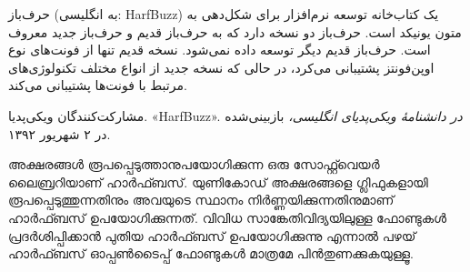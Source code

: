 \documentclass{article}
\begin{document}
حرف‌باز (به انگلیسی: HarfBuzz) یک کتاب‌خانه توسعه نرم‌افزار برای
شکل‌دهی به متون یونیکد است. حرف‌باز دو نسخه دارد که به حرف‌باز قدیم و
حرف‌باز جدید معروف است. حرف‌باز قدیم دیگر توسعه داده نمی‌شود. نسخه قدیم
تنها از فونت‌های نوع اوپن‌فونتز پشتیبانی می‌کرد، در حالی که نسخه جدید
از انواع مختلف تکنولوژی‌های مرتبط با فونت‌ها پشتیبانی می‌کند.

\medskip
\small

مشارکت‌کنندگان ویکی‌پدیا. «HarfBuzz». \textit{در دانشنامهٔ ویکی‌پدیای انگلیسی،}
بازبینی‌شده در ۲ شهریور ۱۳۹۲.

\normalsize
\medskip
{}

അക്ഷരങ്ങൾ രൂപപ്പെടുത്താനുപയോഗിക്കുന്ന ഒരു സോഫ്റ്റ്‍വെയർ ലൈബ്രറിയാണ്
ഹാർഫ്ബസ്. യുണികോഡ് അക്ഷരങ്ങളെ ഗ്ലിഫുകളായി രൂപപ്പെടുത്തുന്നതിനും അവയുടെ
സ്ഥാനം നിർണ്ണയിക്കുന്നതിനുമാണ് ഹാർഫ്ബസ് ഉപയോഗിക്കുന്നത്. വിവിധ
സാങ്കേതിവിദ്യയിലുള്ള ഫോണ്ടുകൾ പ്രദർശിപ്പിക്കാൻ പുതിയ ഹാർഫ്ബസ്
ഉപയോഗിക്കുന്നു എന്നാൽ പഴയ് ഹാർഫ്ബസ് ഓപ്പൺടൈപ്പ് ഫോണ്ടുകൾ മാത്രമേ
പിൻതുണക്കുകയുള്ളൂ.
\end{document}
